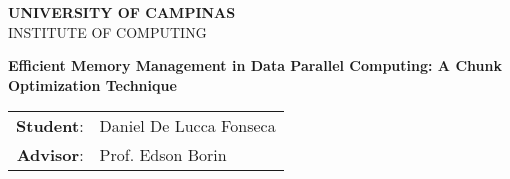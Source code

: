\documentclass[11pt]{article}
\begin{document}


\begin{titlepage} 

    \begin{center} 
        \large \textbf{UNIVERSITY OF CAMPINAS}\\
        \large INSTITUTE OF COMPUTING\\
        
        \vspace{0.5cm}

        \begin{minipage}[tl]{31mm}
        \end{minipage}

        \vspace{0.3cm}
        \textbf{Efficient Memory Management in Data Parallel Computing: A Chunk Optimization Technique}
        \vspace{0.2cm}

        \begin{tabular}{rl}
            \textbf{Student}: & Daniel De Lucca Fonseca \\
            \textbf{Advisor}: & Prof. Edson Borin \\
        \end{tabular}

    \end{center}


\end{titlepage} 


\newcommand{\DF}[1]{{\bf \textcolor{blue}{(DF: #1)}}}
\newcommand{\DFH}[1]{\hl{#1}}
\newcommand{\DFC}[2]{\DFH{#1} \DF{#2}}
\newcommand{\DFADD}[1]{{\textcolor{blue}{#1}}}
\newcommand{\DFRM}[1]{{\textcolor{lightgray}{(#1)}}}
\newcommand{\DFRP}[2]{\DFRM{#1}\DFADD{#2}}
\newcommand{\DFRPD}[2]{#1 \DF{#1 $\rightarrow$ #2?}}


\setlength{\baselineskip}{0.1 cm}
 \pagebreak
\normalsize \tableofcontents \pagebreak
{}

\acresetall






\begin{footnotesize}
\printbibliography
\end{footnotesize}
\end{document}

